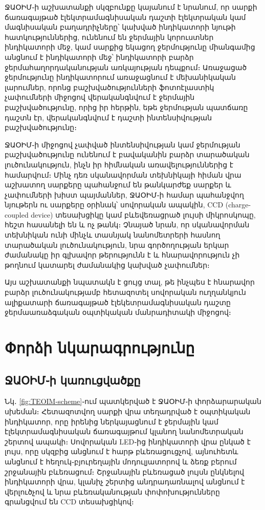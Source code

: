 \documentclass[12pt, fleqn]{report}
\begin{document}
ՋԱՕԻՄ֊ի աշխատանքի սկզբունքը կայանում է նրանում, որ սարքի ճառագայթած էլեկտրամագնիսական դաշտի էլեկտրական կամ մագնիսական բաղադրիչները՝ կախված ինդիկատորի նյութի հատկություններից, ունենում են ջերմային կորուստներ ինդիկատորի մեջ, կամ սարքից եկացող ջերմությունը միանգամից անցնում է ինդիկատորի մեջ՝ ինդիկատորի բարձր ջերմահաղորդականության առկայության դեպքում։ Առաջացած ջերմությունը ինդիկատորում առաջացնում է մեխանիկական լարումներ, որոնց բաշխվածությունների ֆոտոէլաստիկ չափումների միջոցով վերականգնվում է ջերմային բաշխվածությունը, որից իր հերթին, եթե ջերմության պատճառը դաշտն էր, վերականգնվում է դաշտի ինտենսիվության բաշխվածությունը։

ՋԱՕԻՄ֊ի միջոցով չափված ինտենսիվության կամ ջերմության բաշխվածությունը ունենում է բավականին բարձր տարածական լուծունակություն, ինչն իր հիմնական առավելություններից է համարվում։ Մինչ դեռ սկանավորման տեխնիկայի հիման վրա աշխատող սարքերը պահանջում են թանկարժեք սարքեր և չափումների խիստ պայմաններ, ՋԱՕԻՄ֊ի համար պահանջվող նյութերն ու սարքերը օրինակ՝ սովորական ապակին, CCD (charge-coupled device) տեսախցիկը կամ բևեվեռացրած լույսի միկրոսկոպը, հեշտ հասանելի են և ոչ թանկ։ Չնայած նրան, որ սկանավորման տեխնիկան ունի մինչև տասնյակ նանոմետրերի հասնող տարածական լուծունակություն, նրա գործողության երկար ժամանակը իր գլխավոր թերությունն է և հնարավորություն չի թողնում կատարել ժամանակից կախված չափումներ։

Այս աշխատանքի նպատակն է ցույց տալ, թե ինչպես է հնարավոր բարձր լուծունակությամբ հետազոտել սովորական ուղղանկյուն ալիքատարի ճառագայթած էլեկետրամագնիսական դաշտը ջերմաառաձգական օպտիկական մանրադիտակի միջոցով։

\newpage

\renewcommand{\thesection}{\arabic{section}}

\section{Փորձի նկարագրությունը}
\subsection{ՋԱՕԻՄ֊ի կառուցվածքը}

Նկ․ \ref{fig:TEOIM-scheme}֊ում պատկերված է ՋԱՕԻՄ֊ի փորձարարական սխեման։ Հետազոտվող սարքի վրա տեղադրված է օպտիկական ինդիկատոր, որը իրենից ներկայացնում է ջերմային կամ էլեկտրամագնիսական ճառագայթում կլանող նանոմետրական շերտով ապակի։ Սովորական LED֊ից ինդիկատորի վրա ընկած է լույս, որը սկզբից անցնում է հարթ բևեռացուցչով, այնուհետև անցնում է հեղուկ֊բյուրեղային մոդուլյատորով և ձեռք բերում շրջանային բևեռացում։ Շրջանային բևեռացած լույսն ընկնելով ինդիկատորի վրա, կլանիչ շերտից անդրադառնալով անցնում է վերլուծչով և նրա բևեռականության փոփոխությունները գրանցվում են CCD տեսախցիկով։
\end{document}
